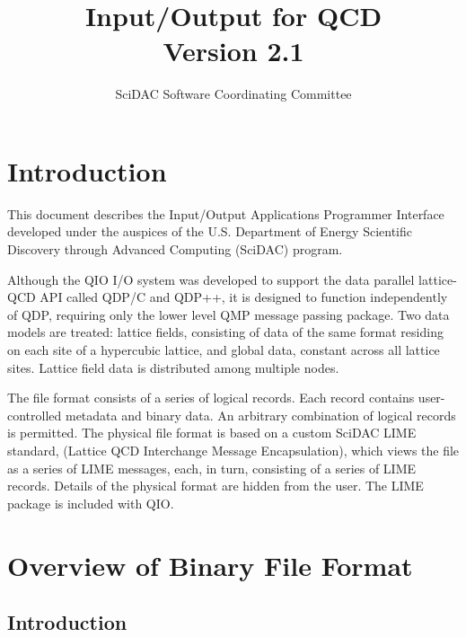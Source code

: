 \documentclass{article}
\begin{document}
\title{
   Input/Output for QCD \\{\large Version 2.1}
}
\author{ SciDAC Software Coordinating Committee}

\maketitle
\section{Introduction}
This document describes the Input/Output Applications Programmer
Interface developed under the auspices of the U.S. Department of
Energy Scientific Discovery through Advanced Computing (SciDAC)
program.

Although the QIO I/O system was developed to support the data parallel
lattice-QCD API called QDP/C and QDP++, it is designed to function
independently of QDP, requiring only the lower level QMP message
passing package.  Two data models are treated: lattice fields,
consisting of data of the same format residing on each site of a
hypercubic lattice, and global data, constant across all lattice
sites.  Lattice field data is distributed among multiple nodes.

The file format consists of a series of logical records.  Each record
contains user-controlled metadata and binary data.  An arbitrary
combination of logical records is permitted.  The physical file format
is based on a custom SciDAC LIME standard, (Lattice QCD Interchange
Message Encapsulation), which views the file as a series of LIME
messages, each, in turn, consisting of a series of LIME records.
Details of the physical format are hidden from the user.  The LIME
package is included with QIO.

\section{Overview of Binary File Format}
\label{sec.fileformat}

\subsection{Introduction}
\end{document}
